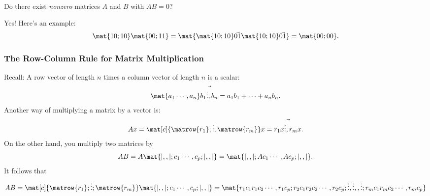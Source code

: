 
\begin{pollframe}

\vskip 5mm

\begin{poll}
\begin{bluebox}[Poll]{.8\textwidth}
  Do there exist \emph{nonzero} matrices $A$ and $B$ with $AB=0$?
\end{bluebox}

\pause\bigskip

Yes!  Here's an example:
\[ \mat{1 0; 1 0}\mat{0 0; 1 1} 
= \mat{\mat{1 0; 1 0}\vec{0 1} \mat{1 0;1 0}\vec{0 1}}
= \mat{0 0; 0 0}. \]
\end{poll}


\end{pollframe}



\begin{frame}
\frametitle{The Row-Column Rule for Matrix Multiplication}

\displayskips{3pt}
\alert{Recall:} A row vector of length $n$ times a column vector of length $n$
is a scalar:
\[ \mat{a_1 \cdots, a_n}\vec{b_1 \vdots, b_n} = a_1b_1 + \cdots + a_nb_n. \]
\pause
Another way of multiplying a matrix by a vector is:
\[ Ax = 
\mat[c]{ \matrow{r_1};
     \vdots ;
     \matrow{r_m}}
     x
= \vec{r_1x \vdots, r_mx}.
\]
\pause
On the other hand, you multiply two matrices by
\[ AB = A\mat{| ,, |; c_1 \cdots, c_p; | ,, |} =
\mat{| ,, |; Ac_1 \cdots, Ac_p; | ,, |}. \]
\pause
It follows that
\[ AB = 
\mat[c]{ \matrow{r_1};
     \vdots ;
     \matrow{r_m}} 
   \mat{ | ,, |; c_1 \cdots, c_p; | ,, |}
= \mat{ r_1c_1 r_1c_2 \cdots, r_1c_p;
         r_2c_1 r_2c_2 \cdots, r_2c_p;
         \vdots, \vdots, , \vdots;
        r_mc_1 r_mc_2 \cdots, r_mc_p}
 \]

\end{frame}



